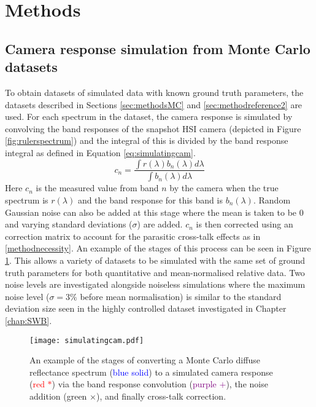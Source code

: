 \section{Methods}
\subsection{Camera response simulation from Monte Carlo datasets}\label{sec:MCcameras}
To obtain datasets of simulated data with known ground truth parameters, the datasets described in Sections \ref{sec:methodsMC} and \ref{sec:methodreference2} are used. For each spectrum in the dataset, the camera response is simulated by convolving the band responses of the snapshot HSI camera (depicted in Figure \ref{fig:rulerspectrum}) and the integral of this is divided by the band response integral as defined in Equation \ref{eq:simulatingcam}. 
\begin{equation}
	c_{n} = \frac{\int r(\lambda)b_n(\lambda) d\lambda}{\int b_n(\lambda) d\lambda}
\label{eq:simulatingcam}
\end{equation}
Here $c_n$ is the measured value from band $n$ by the camera when the true spectrum is $r(\lambda)$ and the band response for this band is $b_n(\lambda)$. Random Gaussian noise can also be added at this stage where the mean is taken to be 0 and varying standard deviations ($\sigma$) are added. $c_n$ is then corrected using an correction matrix to account for the parasitic cross-talk effects as in \ref{methodnecessity}. An example of the stages of this process can be seen in Figure \ref{fig:simulatingcam}. This allows a variety of datasets to be simulated with the same set of ground truth parameters for both quantitative and mean-normalised relative data. Two noise levels are investigated alongside noiseless simulations where the maximum noise level ($\sigma = 3\%$ before mean normalisation) is similar to the standard deviation size seen in the highly controlled dataset investigated in Chapter \ref{chap:SWB}.  
\begin{figure}[h!]
    \centering 
    \texttt{[image: simulatingcam.pdf]}
    \caption{An example of the stages of converting a Monte Carlo diffuse reflectance spectrum (\textcolor{blue}{blue solid}) to a simulated camera response (\textcolor{red}{red $*$}) via the band response convolution (\textcolor{purple}{purple $+$}), the noise addition (\textcolor{MyGreen}{green $\times$}), and finally cross-talk correction.}
    \label{fig:simulatingcam}
\end{figure}

